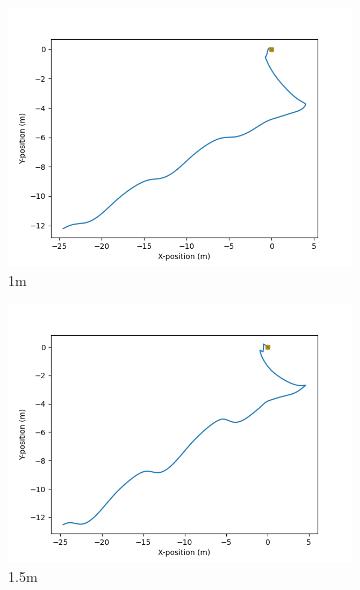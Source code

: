 \documentclass[class=article, crop=false]{standalone}
\begin{document}
\begin{figure}
\begin{subfigure}[b]{0.48\textwidth}
        \includegraphics{scenario1/rov-50m/1.0m/usv_position_controlled}
        \caption{1m}
        \label{}
    \end{subfigure}
    \hfill
    \begin{subfigure}[b]{0.48\textwidth}
        \centering
        \includegraphics{scenario1/rov-50m/1.5m/usv_position_controlled}
        \caption{1.5m}
        \label{}
    \end{subfigure}
    \vfill
    \begin{subfigure}[b]{0.48\textwidth}
        \centering

\end{subfigure}
\end{figure}
\end{document}
